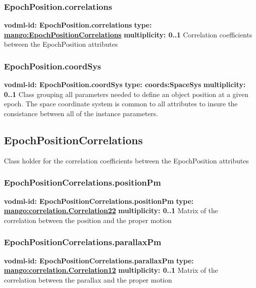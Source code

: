     \subsubsection{EpochPosition.correlations}
      \textbf{vodml-id: EpochPosition.correlations} \newline
      \textbf{type: \hyperref[sect:EpochPositionCorrelations]{mango:EpochPositionCorrelations}} \newline
      \textbf{multiplicity: 0..1} \newline 
      Correlation coefficients between the EpochPosition attributes

    \subsubsection{EpochPosition.coordSys}
      \textbf{vodml-id: EpochPosition.coordSys} \newline
      \textbf{type: coords:SpaceSys} \newline
      \textbf{multiplicity: 0..1} \newline 
      Class grouping all parameters needed to define an object position at a given epoch. The space coordinate system is common to all attributes to insure the consistance between all of the instance parameters.

  \subsection{EpochPositionCorrelations}
  \label{sect:EpochPositionCorrelations}
    Class holder for the correlation coefficients between the EpochPosition attributes

    \subsubsection{EpochPositionCorrelations.positionPm}
      \textbf{vodml-id: EpochPositionCorrelations.positionPm} \newline
      \textbf{type: \hyperref[sect:correlation.Correlation22]{mango:correlation.Correlation22}} \newline
      \textbf{multiplicity: 0..1} \newline 
      Matrix of the correlation between the position and the proper motion

    \subsubsection{EpochPositionCorrelations.parallaxPm}
      \textbf{vodml-id: EpochPositionCorrelations.parallaxPm} \newline
      \textbf{type: \hyperref[sect:correlation.Correlation12]{mango:correlation.Correlation12}} \newline
      \textbf{multiplicity: 0..1} \newline 
      Matrix of the correlation between the parallax and the proper motion

